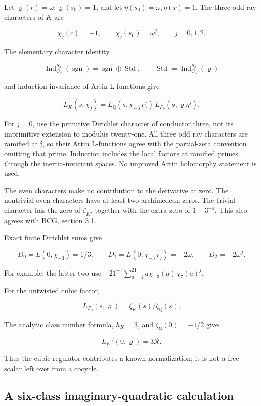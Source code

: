 Let \(\varrho(r)=\omega,\varrho(s_0)=1\), and let
\(\eta(s_0)=\omega,\eta(r)=1\). The three odd ray characters of \(K\)
are

\[
\chi_j(c)=-1,\qquad \chi_j(s_0)=\omega^j,\qquad j=0,1,2.
\]

The elementary character identity

\[
\operatorname{Ind}_{C_2}^{S_3}(\operatorname{sgn})
=\operatorname{sgn}\oplus\operatorname{Std},
\qquad
\operatorname{Std}=\operatorname{Ind}_{C_3}^{S_3}(\varrho)
\]

and induction invariance of Artin L-functions give

\[
\boxed{L_K(s,\chi_j)
=L_{\mathbb Q}(s,\chi_{-3}\chi_7^j)\,
L_{F_0}(s,\varrho\eta^j).} \tag{A2.2}
\]

For \(j=0\), use the primitive Dirichlet character of conductor three,
not its imprimitive extension to modulus twenty-one. All three odd ray
characters are ramified at \(\mathfrak f\), so their Artin L-functions
agree with the partial-zeta convention omitting that prime. Induction
includes the local factors at ramified primes through the
inertia-invariant spaces. No unproved Artin holomorphy statement is
used.

The even characters make no contribution to the derivative at zero. The
nontrivial even characters have at least two archimedean zeros. The
trivial character has the zero of \(\zeta_K\), together with the extra
zero of \(1-3^{-s}\). This also agrees with BCG, section 3.1.

Exact finite Dirichlet sums give

\[
D_0=L(0,\chi_{-3})=1/3,\qquad
D_1=L(0,\chi_{-3}\chi_7)=-2\omega,\qquad
D_2=-2\omega^2. \tag{A2.3}
\]

For example, the latter two use
\(-21^{-1}\sum_{a=1}^{21}a\chi_{-3}(a)\chi_7(a)^j\).

For the untwisted cubic factor,

\[
L_{F_0}(s,\varrho)=\zeta_K(s)/\zeta_{\mathbb Q}(s).
\]

The analytic class number formula, \(h_K=3\), and
\(\zeta_{\mathbb Q}(0)=-1/2\) give

\[
L_{F_0}'(0,\varrho)=3\mathcal R. \tag{A2.4}
\]

Thus the cubic regulator contributes a known normalization; it is not a
free scalar left over from a cocycle.

\hypertarget{A-a-six-class-imaginary-quadratic-calculation}{%
\subsection{A six-class imaginary-quadratic
calculation}\label{A-a-six-class-imaginary-quadratic-calculation}}

